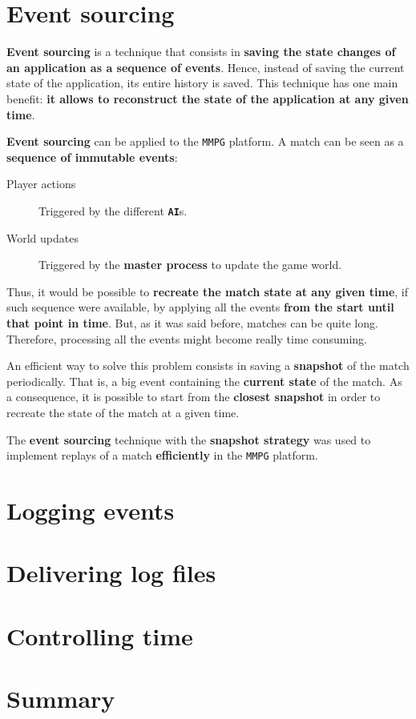 \documentclass[a4paper,11pt,titlepage,abstract,numbers=noenddot,automark,mnsy,intlimits,rgb,dvipsnames]{report}
\begin{document}
\section{Event sourcing}
\textbf{Event sourcing} \cite{event_sourcing} is a technique that consists in \textbf{saving the state changes of an application as a
sequence of events}. Hence, instead of saving the current state of the application, its entire history is saved. This technique
has one main benefit: \textbf{it allows to reconstruct the state of the application at any given time}.

\textbf{Event sourcing} can be applied to the \texttt{MMPG} platform. A match can be seen as a \textbf{sequence of immutable events}:
\begin{description}
\item[Player actions]
Triggered by the different \textbf{\texttt{AI}}s.
\item[World updates]
Triggered by the \textbf{master process} to update the game world.
\end{description}
Thus, it would be possible to \textbf{recreate the match state at any given time}, if such sequence were available, by applying
all the events \textbf{from the start until that point in time}. But, as it was said before, matches can be quite long. Therefore,
processing all the events might become really time consuming.

An efficient way to solve this problem consists in saving a \textbf{snapshot} of the match periodically. That is, a big event
containing the \textbf{current state} of the match. As a consequence, it is possible to start from the \textbf{closest snapshot} in order
to recreate the state of the match at a given time.

The \textbf{event sourcing} technique with the \textbf{snapshot strategy} was used to implement replays of a match \textbf{efficiently} in
the \texttt{MMPG} platform.
\section{Logging events}
\section{Delivering log files}
\section{Controlling time}
\section{Summary}
\end{document}
